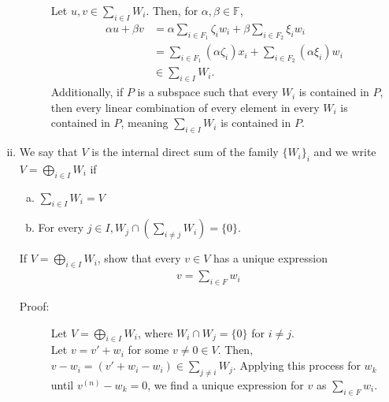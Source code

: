 \documentclass[10pt]{extarticle}
\begin{document}
\begin{enumerate}[(i)]
\begin{description}
        Let $u,v\in \sum_{i\in I}W_i$. Then, for $\alpha,\beta\in \mathbb{F}$,
        \begin{align*}
          \alpha u + \beta v &= \alpha \sum_{i\in F_{1}}\zeta_{i}w_i + \beta\sum_{i\in F_{2}}\xi_{i}w_i\\
                             &= \sum_{i\in F_{1}}(\alpha\zeta_{i})x_i + \sum_{i\in F_{2}}(\alpha\xi_i)w_i\\
                             &\in \sum_{i\in I}W_i.
        \end{align*}
        Additionally, if $P$ is a subspace such that every $W_i$ is contained in $P$, then every linear combination of every element in every $W_i$ is contained in $P$, meaning $\sum_{i\in I}W_i$ is contained in $P$.
    \end{description}
  \item We say that $V$ is the internal direct sum of the family $\{W_i\}_{i}$ and we write $V = \bigoplus_{i\in I}W_i$ if
    \begin{enumerate}[(a)]
      \item $\displaystyle\sum_{i\in I}W_i = V$
      \item For every $\displaystyle j\in I,W_{j}\cap \left(\sum_{i\neq j}W_i\right) = \{0\}$.
    \end{enumerate}
    If $V = \bigoplus_{i\in I}W_i$, show that every $v\in V$ has a unique expression
    \begin{align*}
      v = \sum_{i\in F} w_i \tag*{$F\subseteq I$ finite, $0\neq w_i\in W_i$.}
    \end{align*}
    \begin{description}
      \item[Proof:] Let $V = \bigoplus_{i\in I} W_i$, where $W_i \cap W_j = \{0\}$ for $i\neq j$.\\

        Let $v = v' + w_i$ for some $v\neq 0\in V$. Then, $v-w_i = (v' + w_i - w_i) \in \sum_{j\neq i}W_j$. Applying this process for $w_k$ until $v^{(n)} - w_k = 0$, we find a unique expression for $v$ as $\sum_{i\in F}w_i$.
    \end{description}
  \end{enumerate}
\end{document}
